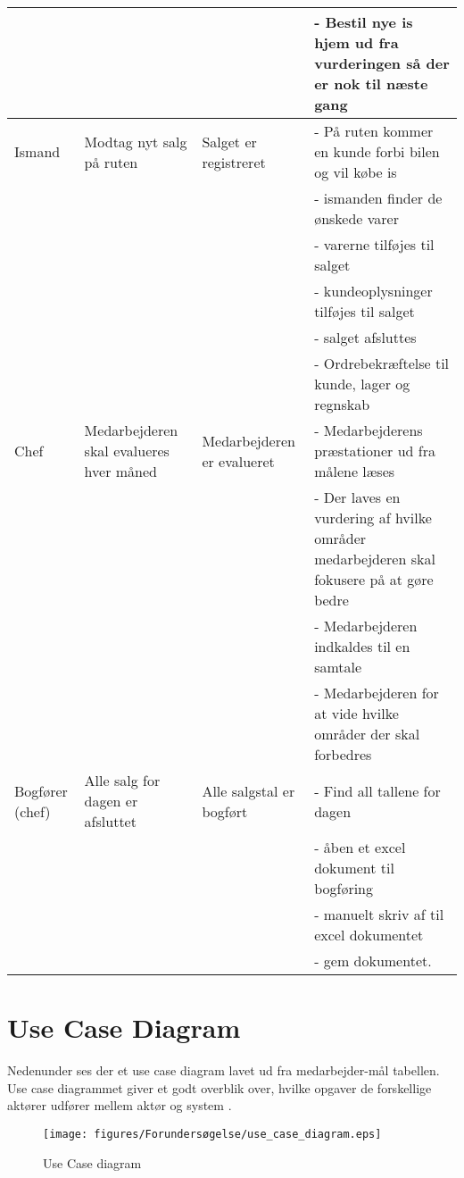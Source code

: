 \begin{center}
\begin{longtable}{ |p{90pt}|p{90pt}|p{90pt}|p{90pt}| }
    &&&
    - Bestil nye is hjem ud fra vurderingen så der er nok til næste gang \\
    \hline
    Ismand & Modtag nyt salg på ruten & Salget er registreret & 
    - På ruten kommer en kunde forbi bilen og vil købe is \\
    &&&
    - ismanden finder de ønskede varer \\
    &&&
    - varerne tilføjes til salget \\
    &&&
    - kundeoplysninger tilføjes til salget \\
    &&&
    - salget afsluttes \\
    &&&
    - Ordrebekræftelse til kunde, lager og regnskab \\
    \hline
    Chef & Medarbejderen skal evalueres hver måned & Medarbejderen er evalueret &
    - Medarbejderens præstationer ud fra målene læses \\
    &&&
    - Der laves en vurdering af hvilke områder medarbejderen skal fokusere på at gøre bedre \\
    &&&
    - Medarbejderen indkaldes til en samtale \\
    &&&
    - Medarbejderen for at vide hvilke områder der skal forbedres \\
    \hline
    Bogfører (chef) & Alle salg for dagen er afsluttet & Alle salgstal er bogført & 
    - Find all tallene for dagen \\
    &&&
    - åben et excel dokument til bogføring \\
    &&&
    - manuelt skriv af til excel dokumentet \\
    &&&
    - gem dokumentet. \\
    \hline
\end{longtable}
\end{center}

\section{Use Case Diagram}\label{usecase}
Nedenunder ses der et use case diagram lavet ud fra medarbejder-mål tabellen. Use case diagrammet giver et godt overblik over, hvilke opgaver de forskellige aktører udfører mellem aktør og system \cite{visual-paradigm.com}. 

\begin{figure}[H]
    \centering
    \texttt{[image: figures/Forundersøgelse/use\_case\_diagram.eps]}
    \caption{Use Case diagram}
    \label{fig:usecasediagram}
\end{figure}


